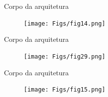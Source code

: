 \documentclass[aspectratio=169]{beamer}
\begin{document}
\begin{frame}{Corpo da arquitetura}
	\justifying
	
	
	
	\begin{figure}[h]
		\centering
		\texttt{[image: Figs/fig14.png]}
	\end{figure}
	
	
	
\end{frame}











\begin{frame}{Corpo da arquitetura}
	\justifying
	
	
	\begin{figure}[h]
		\centering
		\texttt{[image: Figs/fig29.png]}
	\end{figure}
	
	
	
\end{frame}
\begin{frame}{Corpo da arquitetura}
	\justifying
	
	
	\begin{figure}[h]
		\centering
		\texttt{[image: Figs/fig15.png]}
	\end{figure}
	
	
	
\end{frame}
\end{document}
